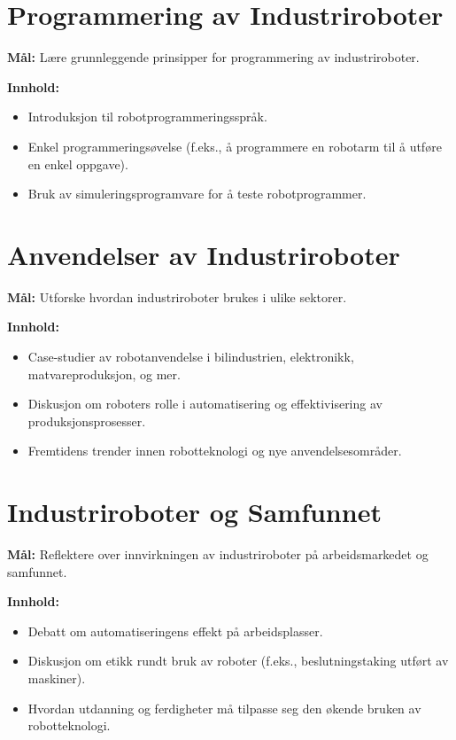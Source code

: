 \section{Programmering av Industriroboter}

\textbf{Mål:} Lære grunnleggende prinsipper for programmering av industriroboter.

\textbf{Innhold:}
\begin{itemize}
    \item Introduksjon til robotprogrammeringsspråk.
    \item Enkel programmeringsøvelse (f.eks., å programmere en robotarm til å utføre en enkel oppgave).
    \item Bruk av simuleringsprogramvare for å teste robotprogrammer.
\end{itemize}

\section{Anvendelser av Industriroboter}

\textbf{Mål:} Utforske hvordan industriroboter brukes i ulike sektorer.

\textbf{Innhold:}
\begin{itemize}
    \item Case-studier av robotanvendelse i bilindustrien, elektronikk, matvareproduksjon, og mer.
    \item Diskusjon om roboters rolle i automatisering og effektivisering av produksjonsprosesser.
    \item Fremtidens trender innen robotteknologi og nye anvendelsesområder.
\end{itemize}

\section{Industriroboter og Samfunnet}

\textbf{Mål:} Reflektere over innvirkningen av industriroboter på arbeidsmarkedet og samfunnet.

\textbf{Innhold:}
\begin{itemize}
    \item Debatt om automatiseringens effekt på arbeidsplasser.
    \item Diskusjon om etikk rundt bruk av roboter (f.eks., beslutningstaking utført av maskiner).
    \item Hvordan utdanning og ferdigheter må tilpasse seg den økende bruken av robotteknologi.
\end{itemize}

